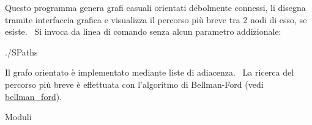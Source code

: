 Questo programma genera grafi casuali orientati debolmente connessi, li disegna tramite interfaccia grafica e visualizza il percorso più breve tra 2 nodi di esso, se esiste.~\newline
 Si invoca da linea di comando senza alcun parametro addizionale\+:~\newline

\begin{DoxyItemize}
\item {\ttfamily }./\+S\+Paths

Il grafo orientato è implementato mediante liste di adiacenza.~\newline
 La ricerca del percorso più breve è effettuata con l'algoritmo di Bellman-\/\+Ford (vedi \hyperlink{operazioni__grafo_8h_a80eb34ff061292b73546e57d066265b6}{bellman\+\_\+ford}). \begin{DoxyParagraph}{Moduli}


\end{DoxyParagraph}
\end{DoxyItemize}
